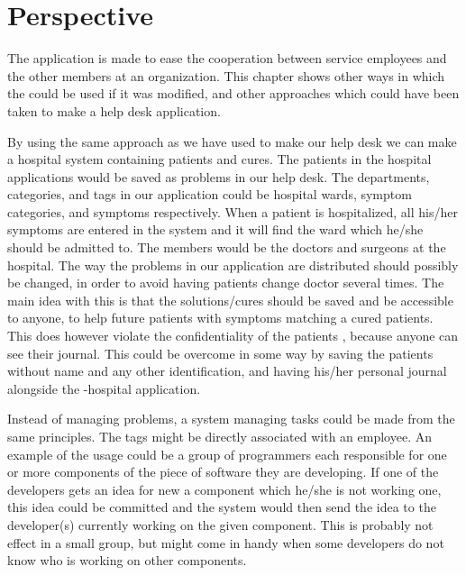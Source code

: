 \chapter{Perspective}
\label{chap:perspective}
The \hdesk[] application is made to ease the cooperation between service employees and the other members at an organization.
This chapter shows other ways in which the \hdesk[] could be used if it was modified, and other approaches which could have been taken to make a help desk application.

By using the same approach as we have used to make our help desk we can make a hospital system containing patients and cures.
The patients in the hospital applications would be saved as problems in our help desk.
The departments, categories, and tags in our application could be hospital wards, symptom categories, and symptoms respectively.
When a patient is hospitalized, all his/her symptoms are entered in the system and it will find the ward which he/she should be admitted to.
The \astaff[] members would be the doctors and surgeons at the hospital.
The way the problems in our application are distributed should possibly be changed, in order to avoid having patients change doctor several times.
The main idea with this is that the solutions/cures should be saved and be accessible to anyone, to help future patients with symptoms matching a cured patients.
This does however violate the confidentiality of the patients \cite{ama}, because anyone can see their journal.
This could be overcome in some way by saving the patients without name and any other identification, and having his/her personal journal alongside the \hdesk[]-hospital application.

Instead of managing problems, a system managing tasks could be made from the same principles.
The tags might be directly associated with an employee.
An example of the usage could be a group of programmers each responsible for one or more components of the piece of software they are developing.
If one of the developers gets an idea for new a component which he/she is not working one, this idea could be committed and the system would then send the idea to the developer(s) currently working on the given component.
This is probably not effect in a small group, but might come in handy when some developers do not know who is working on other components.

